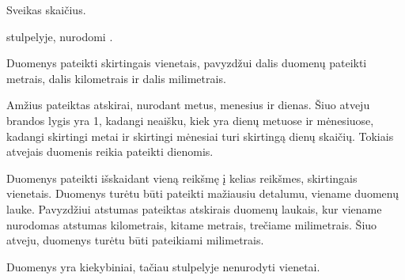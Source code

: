 \documentclass[letterpaper,10pt,lithuanian]{sphinxmanual}
\begin{document}
\begin{fulllineitems}
\label{\detokenize{tipai:type.integer}}
\pysigstartsignatures
{}
\pysigstopsignatures
\sphinxAtStartPar
Sveikas skaičius.

\sphinxAtStartPar
{\hyperref[\detokenize{dimensijos:property.ref}]{}} stulpelyje, nurodomi {\hyperref[\detokenize{vienetai:matavimo-vienetai}]{}}.

\begin{sphinxShadowBox}
\begin{description}
\sphinxAtStartPar
Duomenys pateikti skirtingais vienetais, pavyzdžui dalis duomenų
pateikti metrais, dalis kilometrais ir dalis milimetrais.

\sphinxAtStartPar
Amžius pateiktas atskirai, nurodant metus, menesius ir dienas. Šiuo
atveju brandos lygis yra 1, kadangi neaišku, kiek yra dienų metuose
ir mėnesiuose, kadangi skirtingi metai ir skirtingi mėnesiai turi
skirtingą dienų skaičių. Tokiais atvejais duomenis reikia pateikti
dienomis.

\sphinxAtStartPar
Duomenys pateikti išskaidant vieną reikšmę į kelias reikšmes,
skirtingais vienetais. Duomenys turėtu būti pateikti mažiausiu
detalumu, viename duomenų lauke. Pavyzdžiui atstumas pateiktas
atskirais duomenų laukais, kur viename nurodomas atstumas
kilometrais, kitame metrais, trečiame milimetrais. Šiuo atveju,
duomenys turėtu būti pateikiami milimetrais.

\sphinxAtStartPar
Duomenys yra kiekybiniai, tačiau {\hyperref[\detokenize{dimensijos:property.ref}]{}} stulpelyje
nenurodyti vienetai.

\end{description}
\end{sphinxShadowBox}

\end{fulllineitems}
\end{document}
